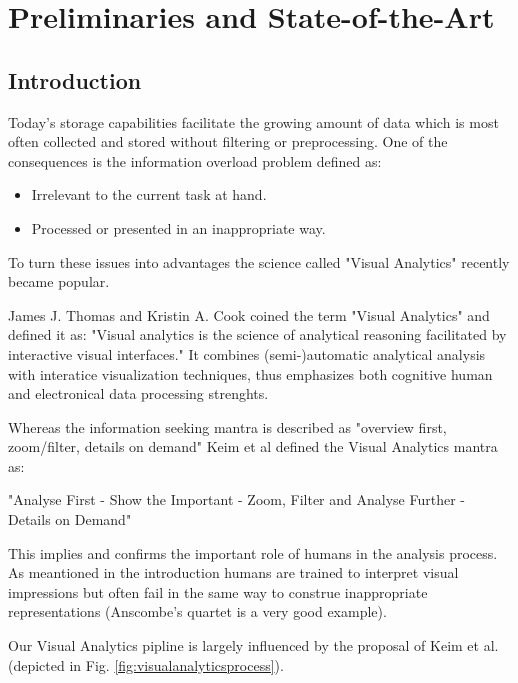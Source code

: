 \section{Preliminaries and State-of-the-Art}\label{sec::relwork} %

\subsection{Introduction}
Today's storage capabilities facilitate the growing amount of data which is most often collected and stored without filtering or preprocessing.
One of the consequences is the information overload problem defined as:

\begin{itemize}
\item Irrelevant to the current task at hand.
\item Processed or presented in an inappropriate way.
\end{itemize}

To turn these issues into advantages the science called "Visual Analytics" recently became popular. 

James J. Thomas and Kristin A. Cook coined the term "Visual Analytics"\cite{VISUAL_ANALYTICS} and defined it as: "Visual analytics is the science of analytical reasoning facilitated by interactive visual interfaces." It combines (semi-)automatic analytical analysis with interatice visualization techniques, thus emphasizes both cognitive human and electronical data processing strenghts.

Whereas the information seeking mantra is described as "overview first, zoom/filter, details on demand" Keim et al defined the Visual Analytics mantra as:

"Analyse First -
Show the Important -
Zoom, Filter and Analyse Further -
Details on Demand"\cite{keim2008visual}

This implies and confirms the important role of humans in the analysis process. As meantioned in the introduction humans are trained to interpret visual impressions but often fail in the same way to construe inappropriate representations (Anscombe's quartet is a very good example).

Our Visual Analytics pipline is largely influenced by the proposal of Keim et al. (depicted in Fig. \ref{fig:visualanalyticsprocess}).

